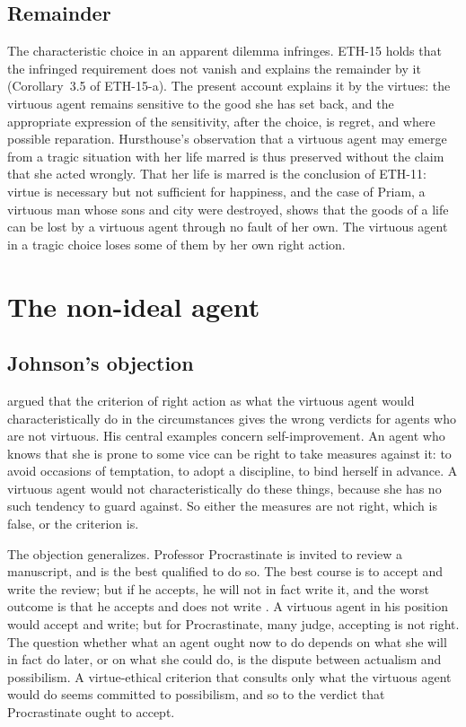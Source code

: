 \documentclass{situationist-preprint}
\begin{document}
\subsection{Remainder}

The characteristic choice in an apparent dilemma infringes. ETH-15 holds that the infringed requirement does not vanish and explains the remainder by it (Corollary~3.5 of ETH-15-a). The present account explains it by the virtues: the virtuous agent remains sensitive to the good she has set back, and the appropriate expression of the sensitivity, after the choice, is regret, and where possible reparation. Hursthouse's observation that a virtuous agent may emerge from a tragic situation with her life marred is thus preserved without the claim that she acted wrongly. That her life is marred is the conclusion of ETH-11: virtue is necessary but not sufficient for happiness, and the case of Priam, a virtuous man whose sons and city were destroyed, shows that the goods of a life can be lost by a virtuous agent through no fault of her own. The virtuous agent in a tragic choice loses some of them by her own right action.

\section{The non-ideal agent}\label{s:nonideal}

\subsection{Johnson's objection}

\citet{Johnson2003} argued that the criterion of right action as what the virtuous agent would characteristically do in the circumstances gives the wrong verdicts for agents who are not virtuous. His central examples concern self-improvement. An agent who knows that she is prone to some vice can be right to take measures against it: to avoid occasions of temptation, to adopt a discipline, to bind herself in advance. A virtuous agent would not characteristically do these things, because she has no such tendency to guard against. So either the measures are not right, which is false, or the criterion is.

The objection generalizes. Professor Procrastinate is invited to review a manuscript, and is the best qualified to do so. The best course is to accept and write the review; but if he accepts, he will not in fact write it, and the worst outcome is that he accepts and does not write \citep{JacksonPargetter1986}. A virtuous agent in his position would accept and write; but for Procrastinate, many judge, accepting is not right. The question whether what an agent ought now to do depends on what she will in fact do later, or on what she could do, is the dispute between actualism and possibilism. A virtue-ethical criterion that consults only what the virtuous agent would do seems committed to possibilism, and so to the verdict that Procrastinate ought to accept.
\end{document}

